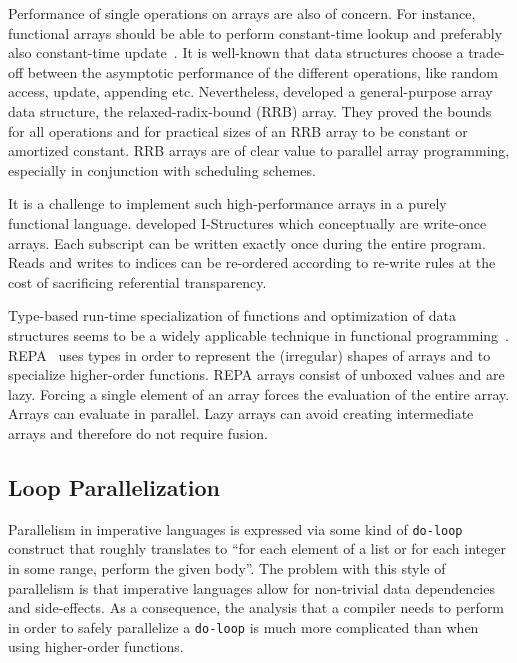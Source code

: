 \documentclass[a4paper]{article}
\begin{document}
Performance of single operations on arrays are also of concern. For
instance, functional arrays should be able to perform constant-time
lookup and preferably also constant-time update~\cite{47507}. It is
well-known that data structures choose a trade-off between the
asymptotic performance of the different operations, like random
access, update, appending etc. Nevertheless,
\citet{Stucki:2015:RVP:2784731.2784739} developed a general-purpose
array data structure, the relaxed-radix-bound (RRB) array. They proved
the bounds for all operations and for practical sizes of an RRB array
to be constant or amortized constant. RRB arrays are of clear value to
parallel array programming, especially in conjunction with scheduling
schemes.

It is a challenge to implement such high-performance arrays in a
purely functional language. \citet{Arvind:1989:IDS:69558.69562}
developed I-Structures which conceptually are write-once arrays. Each
subscript can be written exactly once during the entire program. Reads
and writes to indices can be re-ordered according to re-write rules at
the cost of sacrificing referential transparency.

Type-based run-time specialization of functions and optimization of
data structures seems to be a widely applicable technique in
functional
programming~\cite{Hall:1994:UHT:182409.156781}. REPA~\cite{Keller:2010:RSP:1863543.1863582}
uses types in order to represent the (irregular) shapes of arrays and
to specialize higher-order functions. REPA arrays consist of unboxed
values and are lazy. Forcing a single element of an array forces the
evaluation of the entire array. Arrays can evaluate in parallel. Lazy
arrays can avoid creating intermediate arrays and therefore do not
require fusion.

\subsection{Loop Parallelization}
\label{sec:loop-parallelization}

Parallelism in imperative languages is expressed via some kind of
\texttt{do-loop} construct that roughly translates to ``for each
element of a list or for each integer in some range, perform the given
body''. The problem with this style of parallelism is that imperative
languages allow for non-trivial data dependencies and side-effects. As
a consequence, the analysis that a compiler needs to perform in order
to safely parallelize a \texttt{do-loop} is much more complicated than
when using higher-order functions.
\end{document}
